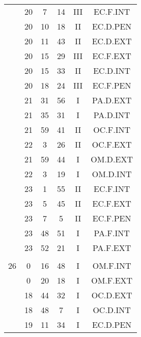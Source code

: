 \documentclass[12pt, a4paper]{article}
\begin{document}
\begin{multicols}{3}
{\begin{tabular}{c c c c c c}
	 	 	 	 & 20 & 7 & 14 & III & EC.F.INT\\%
	 	 	 	 & 20 & 10 & 18 & II & EC.D.PEN\\%
	 	 	 	 & 20 & 11 & 43 & II & EC.D.EXT\\%
	 	 	 	 & 20 & 15 & 29 & III & EC.F.EXT\\%
	 	 	 	 & 20 & 15 & 33 & II & EC.D.INT\\%
	 	 	 	 & 20 & 18 & 24 & III & EC.F.PEN\\%
	 	 	 	 & 21 & 31 & 56 & I & PA.D.EXT\\%
	 	 	 	 & 21 & 35 & 31 & I & PA.D.INT\\%
	 	 	 	 & 21 & 59 & 41 & II & OC.F.INT\\%
	 	 	 	 & 22 & 3 & 26 & II & OC.F.EXT\\%
	 	 	 	 & 21 & 59 & 44 & I & OM.D.EXT\\%
	 	 	 	 & 22 & 3 & 19 & I & OM.D.INT\\%
	 	 	 	 & 23 & 1 & 55 & II & EC.F.INT\\%
	 	 	 	 & 23 & 5 & 45 & II & EC.F.EXT\\%
	 	 	 	 & 23 & 7 & 5 & II & EC.F.PEN\\%
	 	 	 	 & 23 & 48 & 51 & I & PA.F.INT\\%
	 	 	 	 & 23 & 52 & 21 & I & PA.F.EXT\\%
	 	 	 	 & & & & & \\%
	 	 	 	26 & 0 & 16 & 48 & I & OM.F.INT\\%
	 	 	 	 & 0 & 20 & 18 & I & OM.F.EXT\\%
	 	 	 	 & 18 & 44 & 32 & I & OC.D.EXT\\%
	 	 	 	 & 18 & 48 & 7 & I & OC.D.INT\\%
	 	 	 	 & 19 & 11 & 34 & I & EC.D.PEN\\%

\end{tabular}}
\end{multicols}
\end{document}
